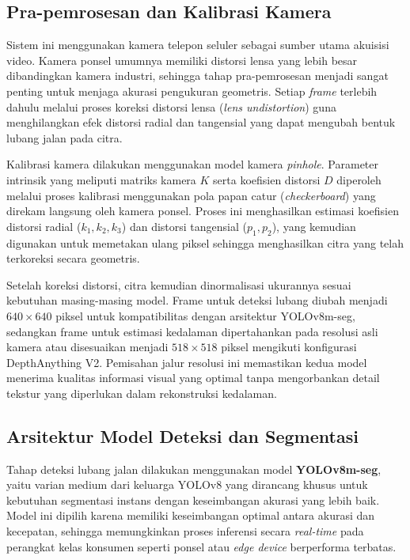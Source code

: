 \documentclass{iopjournal}
\begin{document}
\subsection{Pra-pemrosesan dan Kalibrasi Kamera}
Sistem ini menggunakan kamera telepon seluler sebagai sumber utama akuisisi video. Kamera ponsel umumnya memiliki distorsi lensa yang lebih besar dibandingkan kamera industri, sehingga tahap pra-pemrosesan menjadi sangat penting untuk menjaga akurasi pengukuran geometris. Setiap \textit{frame} terlebih dahulu melalui proses koreksi distorsi lensa (\textit{lens undistortion}) guna menghilangkan efek distorsi radial dan tangensial yang dapat mengubah bentuk lubang jalan pada citra.

Kalibrasi kamera dilakukan menggunakan model kamera \textit{pinhole}. Parameter intrinsik yang meliputi matriks kamera $K$ serta koefisien distorsi $D$ diperoleh melalui proses kalibrasi menggunakan pola papan catur (\textit{checkerboard}) yang direkam langsung oleh kamera ponsel. Proses ini menghasilkan estimasi koefisien distorsi radial ($k_1, k_2, k_3$) dan distorsi tangensial ($p_1, p_2$), yang kemudian digunakan untuk memetakan ulang piksel sehingga menghasilkan citra yang telah terkoreksi secara geometris.

Setelah koreksi distorsi, citra kemudian dinormalisasi ukurannya sesuai kebutuhan masing-masing model. Frame untuk deteksi lubang diubah menjadi $640 \times 640$ piksel untuk kompatibilitas dengan arsitektur YOLOv8m-seg, sedangkan frame untuk estimasi kedalaman dipertahankan pada resolusi asli kamera atau disesuaikan menjadi $518 \times 518$ piksel mengikuti konfigurasi DepthAnything V2. Pemisahan jalur resolusi ini memastikan kedua model menerima kualitas informasi visual yang optimal tanpa mengorbankan detail tekstur yang diperlukan dalam rekonstruksi kedalaman.

\subsection{Arsitektur Model Deteksi dan Segmentasi}
Tahap deteksi lubang jalan dilakukan menggunakan model \textbf{YOLOv8m-seg}, yaitu varian medium dari keluarga YOLOv8 yang dirancang khusus untuk kebutuhan segmentasi instans dengan keseimbangan akurasi yang lebih baik. Model ini dipilih karena memiliki keseimbangan optimal antara akurasi dan kecepatan, sehingga memungkinkan proses inferensi secara \textit{real-time} pada perangkat kelas konsumen seperti ponsel atau \textit{edge device} berperforma terbatas.
\end{document}
